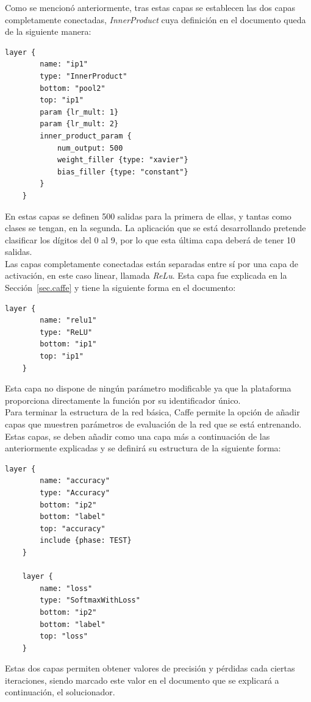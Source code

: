 	Como se mencionó anteriormente, tras estas capas se establecen las dos capas completamente conectadas, \textit{InnerProduct} cuya definición en el documento queda de la siguiente manera: 
	\vspace{10pt}
	\begin{lstlisting}[frame=single]
	layer {
		name: "ip1"
		type: "InnerProduct"
		bottom: "pool2"
		top: "ip1"
		param {lr_mult: 1}
		param {lr_mult: 2}
		inner_product_param {
			num_output: 500
			weight_filler {type: "xavier"}
			bias_filler {type: "constant"}
		}
	}	
	\end{lstlisting}
	
	En estas capas se definen 500 salidas para la primera de ellas, y tantas como clases se tengan, en la segunda. La aplicación que se está desarrollando pretende clasificar los dígitos del 0 al 9, por lo que esta última capa deberá de tener 10 salidas.\\

	Las capas completamente conectadas están separadas entre sí por una capa de activación, en este caso linear, llamada \textit{ReLu}. Esta capa fue explicada en la Sección~\ref{sec.caffe} y tiene la siguiente forma en el documento:
	\vspace{10pt}
	\begin{lstlisting}[frame=single]
	layer {
		name: "relu1"
		type: "ReLU"
		bottom: "ip1"
		top: "ip1"
	}	
	\end{lstlisting}
	
	Esta capa no dispone de ningún parámetro modificable ya que la plataforma proporciona directamente la función por su identificador único.\\
	
	Para terminar la estructura de la red básica, Caffe permite la opción de añadir capas que muestren parámetros de evaluación de la red que se está entrenando. Estas capas, se deben añadir como una capa más a continuación de las anteriormente explicadas y se definirá su estructura de la siguiente forma:
	\vspace{10pt}
	\begin{lstlisting}[frame=single]
	layer {
		name: "accuracy"
		type: "Accuracy"
		bottom: "ip2"
		bottom: "label"
		top: "accuracy"
		include {phase: TEST}
	}
	
	layer {
		name: "loss"
		type: "SoftmaxWithLoss"
		bottom: "ip2"
		bottom: "label"
		top: "loss"
	}	
	\end{lstlisting}
	
	Estas dos capas permiten obtener valores de precisión y pérdidas cada ciertas iteraciones, siendo marcado este valor en el documento que se explicará a continuación, el solucionador.\\

